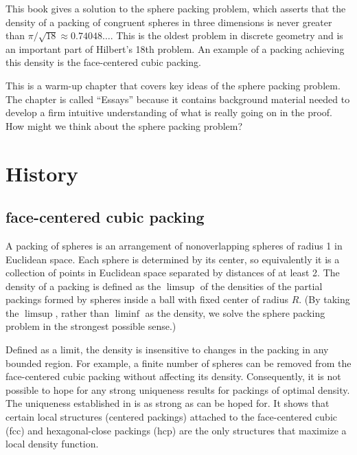 









This book gives a solution to the sphere packing
problem,  which asserts that the density of a packing of
congruent spheres in three dimensions is never greater than
$\pi/\sqrt{18}\approx 0.74048\ldots$. This is the oldest problem
in discrete geometry and is an important part of Hilbert's 18th
problem. An example of a packing achieving this density is the
face-centered cubic packing.

This is a warm-up chapter that covers key ideas of the sphere packing problem.
The chapter is called ``Essays'' because it contains background material
needed to develop a firm intuitive understanding of what is really going on in the proof.   How might we think about the sphere packing problem?  


\section{History}
\label{sec:intro-review}

\subsection{face-centered cubic packing}

A packing of spheres is an arrangement of
nonoverlapping spheres of radius 1 in Euclidean space.
Each sphere is determined by its center, so equivalently it is a collection
of points in Euclidean space separated by distances of at least 2.
The density of a packing is defined as the $\limsup$ of
the densities of the partial packings formed by spheres inside
a ball with fixed center of radius $R$.
(By taking the $\limsup$,
rather than $\liminf$ as the density, we solve the sphere packing problem
in the strongest possible sense.)

Defined as a limit, the density
is insensitive to changes in the packing in any bounded region.
For example, a finite number of spheres can be removed from the
face-centered cubic packing without affecting its density.
Consequently, it is not possible to hope for any strong uniqueness
results for packings of optimal density.  The uniqueness
established in \cite{DCG} is as strong as can be hoped for. It
shows that certain local structures (centered packings) attached
to the face-centered cubic (fcc) and hexagonal-close packings
(hcp) are the only structures that maximize a local density
function.

